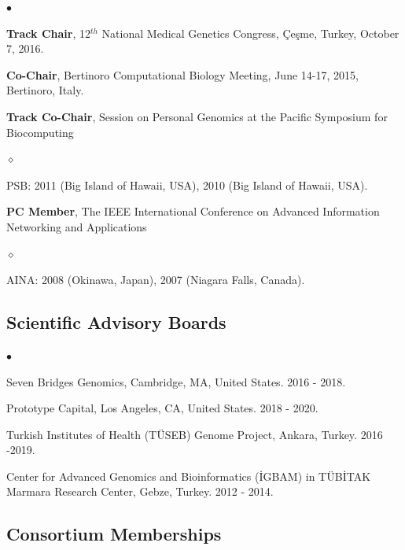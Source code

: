 \documentclass[margin,line]{res}
\newenvironment{list2}{
  \begin{list}{$\bullet$}{%
      \setlength{\itemsep}{0.1cm}
      \setlength{\parsep}{0in} \setlength{\parskip}{0in}
      \setlength{\topsep}{0in} \setlength{\partopsep}{0in} 
      \setlength{\leftmargin}{0.2in}}}{\end{list}}
\newenvironment{list3}{
  \begin{list}{$\diamond$}{%
      \setlength{\itemsep}{0in}
      \setlength{\parsep}{0.1cm} \setlength{\parskip}{0.1cm}
      \setlength{\topsep}{0.1cm} \setlength{\partopsep}{0.1cm} 
      \setlength{\leftmargin}{0.2in}}}{\end{list}}
\begin{document}
\begin{resume}
\begin{list2}
    \item
        \textbf{Track Chair}, 12$^{th}$ National Medical Genetics Congress, Çeşme, Turkey, October 7, 2016.
    
    \item
        \textbf{Co-Chair}, Bertinoro Computational Biology Meeting, June 14-17, 2015, Bertinoro, Italy.

    \item 
        \textbf{Track Co-Chair}, Session on Personal Genomics at the Pacific Symposium for Biocomputing 
        \begin{list3}
            \item PSB: 2011 (Big Island of Hawaii, USA), 2010 (Big Island of Hawaii, USA).
        \end{list3}
        
    \item
        \textbf{PC Member}, The IEEE International Conference on Advanced Information Networking and Applications 
        \begin{list3}
            \item AINA: 2008 (Okinawa, Japan), 2007 (Niagara Falls, Canada).
        \end{list3}
    
\end{list2}

\vspace{-0.4cm}
\subsection{\small \sc Scientific Advisory Boards}
\begin{list2}
\item
  Seven Bridges Genomics, Cambridge, MA, United States. 2016 - 2018.
    \item
        Prototype Capital, Los Angeles, CA, United States. 2018 - 2020.
    \item
        Turkish Institutes of Health (TÜSEB) Genome Project, Ankara, Turkey. 2016 -2019.
    \item
        Center for Advanced Genomics and Bioinformatics (\.{I}GBAM) in T\"{U}B\.{I}TAK Marmara Research Center, Gebze, Turkey. 2012 - 2014.
\end{list2}

\vspace{-0.4cm}
\subsection{\small \sc Consortium Memberships}


\end{resume}
\end{document}
